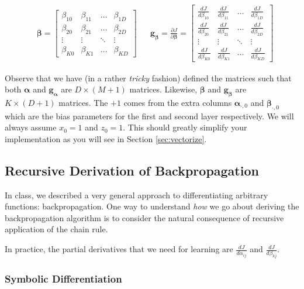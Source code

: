 \documentclass[11pt,addpoints,answers]{exam}
\newcommand{\adj}[1]{\frac{d J}{d #1}}
\newcommand{\gv}{\mathbf{g}}
\newcommand{\alphav     }{\boldsymbol \alpha     }
\newcommand{\betav      }{\boldsymbol \beta      }
\begin{document}
\begin{align}
    &\betav =
    \begin{bmatrix}
        \beta_{10} & \beta_{11} & \dots  & \beta_{1D} \\
        \beta_{20} & \beta_{21} & \dots  & \beta_{2D} \\
        \vdots      & \vdots      & \ddots & \vdots \\
        \beta_{K0} & \beta_{K1} & \dots  & \beta_{KD}
    \end{bmatrix}
    &&
    \gv_{\betav} = \frac{\partial J}{\partial \betav} = 
    \begin{bmatrix}
        \adj{\beta_{10}} & \adj{\beta_{11}} & \dots  & \adj{\beta_{1D}} \\
        \adj{\beta_{20}} & \adj{\beta_{21}} & \dots  & \adj{\beta_{2D}} \\
        \vdots      & \vdots      & \ddots & \vdots \\
        \adj{\beta_{K0}} & \adj{\beta_{K1}} & \dots  & \adj{\beta_{KD}}
    \end{bmatrix}
\end{align}

Observe that we have (in a rather \emph{tricky} fashion) defined the matrices such that both $\alphav$ and $\gv_{\alphav}$ are $D \times (M+1)$ matrices. Likewise, $\betav$ and $\gv_{\betav}$ are $K \times (D+1)$ matrices. The $+1$ comes from the extra columns $\alphav_{\cdot, 0}$ and $\betav_{\cdot, 0}$ which are the bias parameters for the first and second layer respectively. We will always assume $x_0 = 1$ and $z_0 = 1$. This should greatly simplify your implementation as you will see in Section \ref{sec:vectorize}.


\subsection{Recursive Derivation of Backpropagation}
\label{sec:recursive}

In class, we described a very general approach to differentiating arbitrary functions: backpropagation. One way to understand \emph{how} we go about deriving the backpropagation algorithm is to consider the natural consequence of recursive application of the chain rule. 

In practice, the partial derivatives that we need for learning are $\adj{\alpha_{ij}}$ and $\adj{\beta_{kj}}$.

\subsubsection{Symbolic Differentiation}
\end{document}
